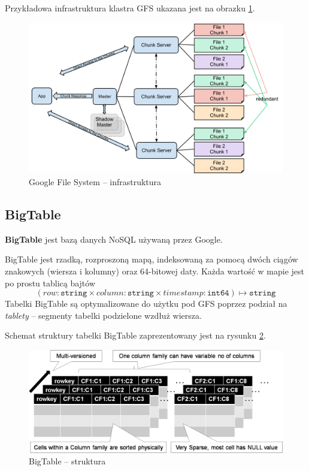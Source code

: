 \documentclass[10pt,twocolumn]{llncs}          %
\begin{document}
Przykładowa infrastruktura klastra GFS ukazana jest na obrazku \ref{fig:google:gfs}.


\begin{figure}
    \includegraphics[scale=0.1]{obrazki/GoogleFileSystemGFS.png}
    \caption{Google File System -- infrastruktura}
    \label{fig:google:gfs}       %
\end{figure}

\subsection{BigTable}
\label{ssub:bigtable}
\textbf{BigTable} jest bazą danych NoSQL używaną przez Google. 

BigTable jest rzadką, rozproszoną mapą, indeksowaną za pomocą dwóch ciągów znakowych (wiersza i kolumny) oraz 64-bitowej daty. Każda wartość w mapie jest po prostu tablicą bajtów
$$(row: \texttt{string} \times column: \texttt{string} \times timestamp: \texttt{int64}) \mapsto \texttt{string}$$
Tabelki BigTable są optymalizowane do użytku pod GFS poprzez podział na \textit{tablety} -- segmenty tabelki podzielone wzdłuż wiersza.

Schemat struktury tabelki BigTable zaprezentowany jest na rysunku \ref{fig:google:big-table}.


\begin{figure}
    \centerline{\includegraphics[scale=0.75]{obrazki/big-table.png}}
    \caption{BigTable -- struktura}
    \label{fig:google:big-table}       %
\end{figure}
\end{document}
